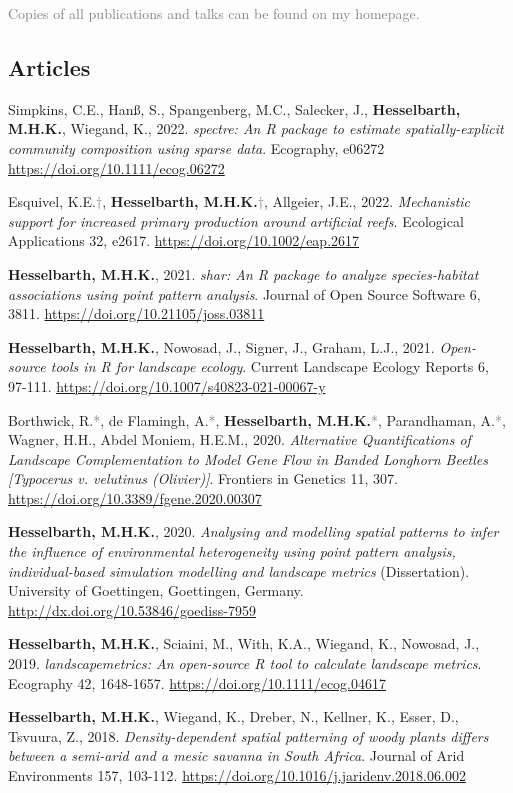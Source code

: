 \documentclass[hidelinks]{report}
\begin{document}
\textcolor{grey}{\footnotesize{Copies of all publications and talks can be found on my homepage.}}

\subsection*{Articles}

\begin{hangparas}{7.5mm}{1}

Simpkins, C.E., Hanß, S., Spangenberg, M.C., Salecker, J., \textbf{Hesselbarth, M.H.K.}, Wiegand, K., 2022. \textit{spectre: An R package to estimate spatially-explicit community composition using sparse data}. Ecography, e06272 \url{https://doi.org/10.1111/ecog.06272}

Esquivel, K.E.\textcolor{grey}{†}, \textbf{Hesselbarth, M.H.K.}\textcolor{grey}{†}, Allgeier, J.E., 2022. \textit{Mechanistic support for increased primary production around artificial reefs}. Ecological Applications 32, e2617. \url{https://doi.org/10.1002/eap.2617}

\textbf{Hesselbarth, M.H.K.}, 2021. \textit{shar: An R package to analyze species-habitat associations using point pattern analysis}. Journal of Open Source Software 6, 3811. \url{https://doi.org/10.21105/joss.03811}

\textbf{Hesselbarth, M.H.K.}, Nowosad, J., Signer, J., Graham, L.J., 2021. \textit{Open-source tools in R for landscape ecology}. Current Landscape Ecology Reports 6, 97-111. \url{https://doi.org/10.1007/s40823-021-00067-y}

Borthwick, R.\textcolor{grey}{*}, de Flamingh, A.\textcolor{grey}{*}, \textbf{Hesselbarth, M.H.K.}\textcolor{grey}{*}, Parandhaman, A.\textcolor{grey}{*}, Wagner, H.H., Abdel Moniem, H.E.M., 2020. \textit{Alternative Quantifications of Landscape Complementation to Model Gene Flow in Banded Longhorn Beetles [Typocerus v. velutinus (Olivier)]}. Frontiers in Genetics 11, 307. \url{https://doi.org/10.3389/fgene.2020.00307}

\textbf{Hesselbarth, M.H.K.}, 2020. \textit{Analysing and modelling spatial patterns to infer the influence of environmental heterogeneity using point pattern analysis, individual-based simulation modelling and landscape metrics} (Dissertation). University of Goettingen, Goettingen, Germany. \url{http://dx.doi.org/10.53846/goediss-7959}

\textbf{Hesselbarth, M.H.K.}, Sciaini, M., With, K.A., Wiegand, K., Nowosad, J., 2019. \textit{landscapemetrics: An open-source R tool to calculate landscape metrics}. Ecography 42, 1648-1657. \url{https://doi.org/10.1111/ecog.04617}

\textbf{Hesselbarth, M.H.K.}, Wiegand, K., Dreber, N., Kellner, K., Esser, D., Tsvuura, Z., 2018. \textit{Density-dependent spatial patterning of woody plants differs between a semi-arid and a mesic savanna in South Africa}. Journal of Arid Environments 157, 103-112. \url{https://doi.org/10.1016/j.jaridenv.2018.06.002}

\end{hangparas}
\end{document}
